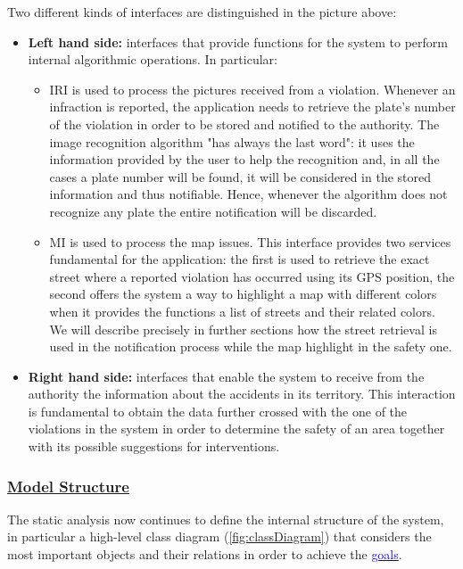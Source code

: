 		Two different kinds of interfaces are distinguished in the picture above:
		\begin{itemize}
			\item \textbf{Left hand side:} interfaces that provide functions for the system to perform internal algorithmic operations. In particular:
			\begin{itemize}
				\item \textsc{IRI} is used to process the pictures received from a violation. Whenever an infraction is reported, the application needs to retrieve the plate's number of the violation in order to be stored and notified to the authority. The image recognition algorithm "has always the last word": it uses the information provided by the user to help the recognition and, in all the cases a plate number will be found, it will be considered in the stored information and thus notifiable. Hence, whenever the algorithm does not recognize any plate the entire notification will be discarded.
			
				\item \textsc{MI} is used to process the map issues. This interface provides two services fundamental for the application: the first is used to retrieve the exact street where a reported violation has occurred using its GPS position, the second offers the system a way to highlight a map with different colors when it provides the functions a list of streets and their related colors. We will describe precisely in further sections how the street retrieval is used in the notification process while the map highlight in the safety one.
			\end{itemize}
			
			\item \textbf{Right hand side:} interfaces that enable the system to receive from the authority the information about the accidents in its territory. This interaction is fundamental to obtain the data further crossed with the one of the violations in the system in order to determine the safety of an area together with its possible suggestions for interventions.
			
		\end{itemize}
	
	\subsubsection[Model Structure]{\hyperlink{toc}{Model Structure}}
	The static analysis now continues to define the internal structure of the system, in particular a high-level class diagram (\autoref{fig:classDiagram}) that considers the most important objects and their relations in order to achieve the \hyperref[sec:goals]{\textcolor{blue}{goals}}.\\
	
